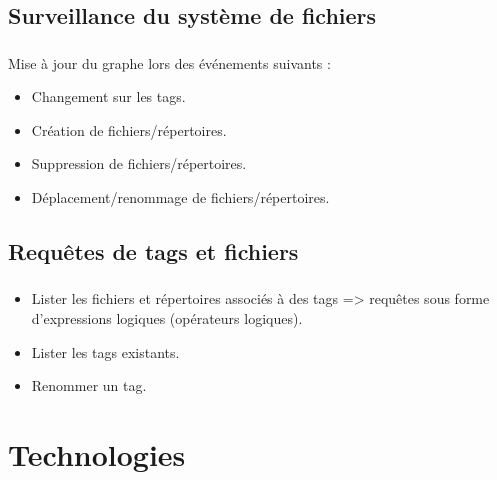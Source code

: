 \documentclass[10pt]{beamer}
\begin{document}
\subsection{Surveillance du système de fichiers}
\begin{frame}
    \frametitle{\subsecname}
    Mise à jour du graphe lors des événements suivants :
    \bigbreak
    \pause
    \begin{itemize}
        \item Changement sur les tags.
        \pause
        \item Création de fichiers/répertoires.
        \pause
        \item Suppression de fichiers/répertoires.
        \pause
        \item Déplacement/renommage de fichiers/répertoires.
    \end{itemize}
\end{frame}

\subsection{Requêtes de tags et fichiers}
\begin{frame}
    \frametitle{\subsecname}
    \begin{itemize}
        \pause
        \item Lister les fichiers et répertoires associés à des tags => requêtes sous forme 
            d'expressions logiques (opérateurs logiques).
        \pause
        \item Lister les tags existants.
        \pause
        \item Renommer un tag.
    \end{itemize}
\end{frame}

\section{Technologies}
\end{document}
